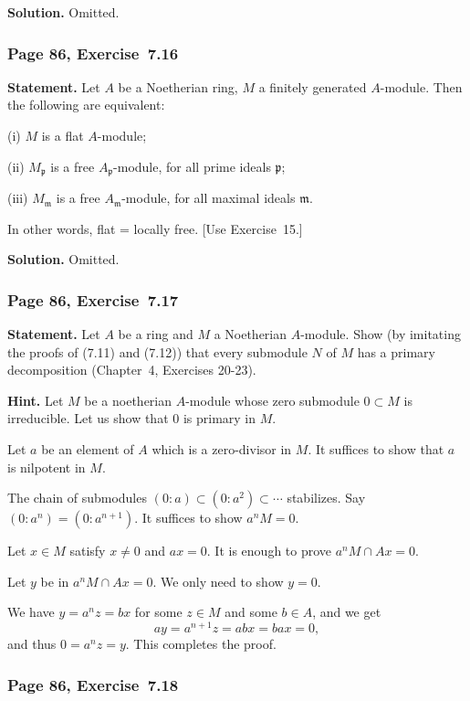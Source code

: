 \documentclass[12pt,letterpaper]{article}%
\newcommand{\mf}{\mathfrak}
\newcommand{\mmm}{\mf m}
\newcommand{\ppp}{\mf p}
\newcommand{\nn}{\noindent}
\begin{document}
\nn\textbf{Solution.} Omitted.

\subsubsection{Page 86, Exercise~7.16}\label{ex7.16}%

\textbf{Statement.} Let $A$ be a Noetherian ring, $M$ a finitely generated $A$-module. Then the following are equivalent:

\nn(i) $M$ is a flat $A$-module;

\nn(ii) $M_\ppp$ is a free $A_\ppp$-module, for all prime ideals $\ppp$;

\nn(iii) $M_\mmm$ is a free $A_\mmm$-module, for all maximal ideals $\mmm$.

In other words, flat = locally free. [Use Exercise~15.]

\nn\textbf{Solution.} Omitted.

\subsubsection{Page 86, Exercise~7.17}%

\textbf{Statement.} Let $A$ be a ring and $M$ a Noetherian $A$-module. Show (by imitating the proofs of (7.11) and (7.12)) that every submodule $N$ of $M$ has a primary decomposition (Chapter~4, Exercises 20-23).

\nn\textbf{Hint.} Let $M$ be a noetherian $A$-module whose zero submodule $0\subset M$ is irreducible. Let us show that $0$ is primary in $M$. 

Let $a$ be an element of $A$ which is a zero-divisor in $M$. It suffices to show that $a$ is nilpotent in $M$. 

The chain of submodules $(0:a)\subset(0:a^2)\subset\cdots$ stabilizes. Say $(0:a^n)=(0:a^{n+1})$. It suffices to show $a^nM=0$. 

Let $x\in M$ satisfy $x\ne0$ and $ax=0$. It is enough to prove $a^nM\cap Ax=0$. 

Let $y$ be in $a^nM\cap Ax=0$. We only need to show $y=0$. 

We have $y=a^nz=bx$ for some $z\in M$ and some $b\in A$, and we get 
$$
ay=a^{n+1}z=abx=bax=0,
$$ 
and thus $0=a^nz=y$. This completes the proof. 

\subsubsection{Page 86, Exercise~7.18}\label{ex7.18}%
\end{document}
